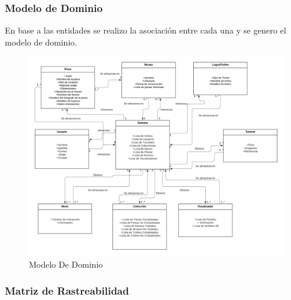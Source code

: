 \subsubsection{Modelo de Dominio}
En base a las entidades se realizo la asociación entre cada una y se genero el modelo de dominio.

\begin{figure}[H]
\centerline{\includegraphics[width=15cm]{imgs/ModeloDeDominio.png}}
\caption{Modelo De Dominio}
\label{ModeloDom}
\end{figure}

\subsubsection{Matriz de Rastreabilidad}